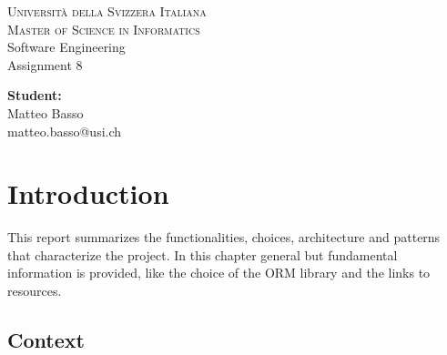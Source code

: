 \documentclass[a4paper]{report}
\begin{document}
	
	\begin{titlepage}
		\begin{center}
			\textsc{ \LARGE{Università della Svizzera Italiana \\}}
			\textsc{ \LARGE{Master of Science in Informatics\\ }}
			\vspace{30mm}
			\fontsize{10mm}{7mm}\selectfont 
			\textup{Software Engineering\\Assignment 8}\\
			\vspace{70mm}
		\end{center}
		
		\vspace{25mm}
		
		\begin{minipage}[t]{0.47\textwidth}
		\end{minipage}\hfill\begin{minipage}[t]{0.47\textwidth}\raggedleft
			\textnormal{\large{\bf Student:\\}}
			{\large Matteo Basso\\matteo.basso@usi.ch}
		\end{minipage}
		
		\vspace{20mm}
		
		
	\end{titlepage}
	
	\tableofcontents
	\glsaddall
	\printglossary[type=\acronymtype]
	\printglossary[type=main,title={Glossary},toctitle={Glossary}]
	
	\chapter{Introduction}
	\label{chap:introduction}
	
	This report summarizes the functionalities, choices, architecture and patterns that characterize the project. In this chapter general but fundamental information is provided, like the choice of the ORM library and the links to resources.
	
	\section{Context}
	\label{sec:context}
	
\end{document}
